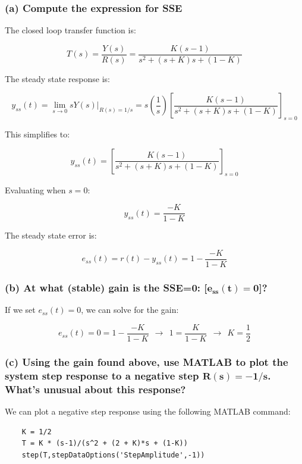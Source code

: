 \documentclass[12pt, letterpaper]{../assignment}
\begin{document}
\subsubsection*{(a) Compute the expression for SSE}

The closed loop transfer function is:

$$ T(s) = \frac{Y(s)}{R(s)} = \frac{K(s-1)}{s^2 + (s+K)s + (1-K)}  $$

The steady state response is:

$$ y_{ss}(t) = \lim_{s \to 0} sY(s) \bigg|_{R(s) = 1/s}
    = s \left(\frac{1}{s}\right)\left[\frac{K(s-1)}{s^2 + (s+K)s + (1-K)}\right]_{s=0} $$

This simplifies to:

$$ y_{ss}(t) = \left[\frac{K(s-1)}{s^2 + (s+K)s + (1-K)}\right]_{s=0}  $$

Evaluating when $s=0$:

$$ y_{ss}(t) = \frac{-K}{1-K} $$

The steady state error is:

\begin{answer}
$$ e_{ss}(t) = r(t) - y_{ss}(t) = 1 - \frac{-K}{1-K} $$
\end{answer}

\subsubsection*{(b) At what (stable) gain is the SSE=0: [$\mathbf{e_{ss}(t) = 0}$]?}

If we set $e_{ss}(t) = 0$, we can solve for the gain:

\begin{answer}
$$ e_{ss}(t) = 0 = 1 - \frac{-K}{1-K}
    \ \ \rightarrow \ \ 1 = \frac{K}{1-K}
    \ \ \rightarrow \ \ K = \frac{1}{2} $$
\end{answer}

\subsubsection*{(c) Using the gain found above,
use MATLAB to plot the system step response to a negative step $\mathbf{R(s)=-1/s}$.
What's unusual about this response?}

We can plot a negative step response using the following MATLAB command:

\color{white}
\begin{verbatim}
    K = 1/2
    T = K * (s-1)/(s^2 + (2 + K)*s + (1-K))
    step(T,stepDataOptions('StepAmplitude',-1))
\end{verbatim}
\color{black}
\end{document}
